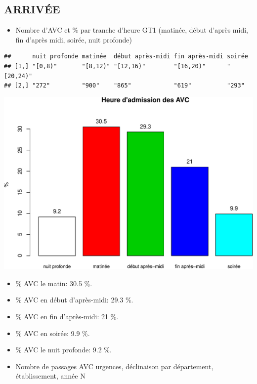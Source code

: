 \documentclass[]{article}
\begin{document}
\subsection{ARRIVÉE}\label{arrivee-2}

\begin{itemize}
\itemsep1pt\parskip0pt
\item
  Nombre d'AVC et \% par tranche d'heure GT1 (matinée, début d'après
  midi, fin d'après midi, soirée, nuit profonde)
\end{itemize}

\begin{verbatim}
##      nuit profonde matinée  début après-midi fin après-midi soirée   
## [1,] "[0,8)"       "[8,12)" "[12,16)"        "[16,20)"      "[20,24)"
## [2,] "272"         "900"    "865"            "619"          "293"
\end{verbatim}

\includegraphics{rapport2014_V4_files/figure-latex/avc_periode-1.pdf}

\begin{itemize}
\item
  \% AVC le matin: 30.5 \%.
\item
  \% AVC en début d'après-midi: 29.3 \%.
\item
  \% AVC en fin d'après-midi: 21 \%.
\item
  \% AVC en soirée: 9.9 \%.
\item
  \% AVC le nuit profonde: 9.2 \%.
\item
  Nombre de passages AVC urgences, déclinaison par département,
  établissement, année N
\end{itemize}
\end{document}
